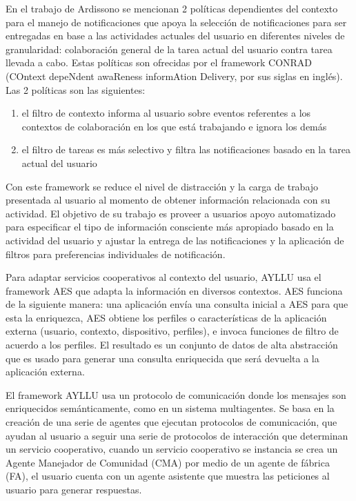 En el trabajo de Ardissono \cite{ardissono2012context} se mencionan 2 pol\'iticas dependientes del contexto para el manejo de notificaciones que apoya la selecci\'on de notificaciones para ser entregadas en base a las actividades actuales del usuario en diferentes niveles de granularidad: colaboraci\'on general de la tarea actual del usuario contra tarea llevada a cabo. Estas pol\'iticas son ofrecidas por el framework CONRAD (COntext depeNdent awaReness informAtion Delivery, por sus siglas en ingl\'es). Las 2 pol\'iticas son las siguientes:

\begin{enumerate}
\item el filtro de contexto informa al usuario sobre eventos referentes a los contextos de colaboraci\'on en los que est\'a trabajando e ignora los dem\'as
\item el filtro de tareas es m\'as selectivo y filtra las notificaciones basado en la tarea actual del usuario
\end{enumerate}

Con este framework se reduce el nivel de distracci\'on y la carga de trabajo presentada al usuario al momento de obtener informaci\'on relacionada con su actividad.
El objetivo de su trabajo es proveer a usuarios apoyo automatizado para especificar el tipo de informaci\'on consciente m\'as apropiado basado en la actividad del usuario y ajustar la entrega de las notificaciones y la aplicaci\'on de filtros para preferencias individuales de notificaci\'on.

Para adaptar servicios cooperativos al contexto del usuario, AYLLU \cite{arias2012platform} usa el framework AES que adapta la informaci\'on en diversos contextos. AES funciona de la siguiente manera: una aplicaci\'on env\'ia una consulta inicial a AES para que esta la enriquezca, AES obtiene los perfiles o caracter\'isticas de la aplicaci\'on externa (usuario, contexto, dispositivo, perfiles), e invoca funciones de filtro de acuerdo a los perfiles. El resultado es un conjunto de datos de alta abstracci\'on que es usado para generar una consulta enriquecida que ser\'a devuelta a la aplicaci\'on externa.

El framework AYLLU \cite{arias2012platform} usa un protocolo de comunicaci\'on donde los mensajes son enriquecidos sem\'anticamente, como en un sistema multiagentes. Se basa en la creaci\'on de una serie de agentes que ejecutan protocolos de  comunicaci\'on, que ayudan al usuario a seguir una serie de protocolos de interacci\'on que determinan un servicio cooperativo, cuando un servicio cooperativo se instancia se crea un Agente Manejador de Comunidad (CMA) por medio de un agente de f\'abrica (FA), el usuario cuenta con un agente asistente que muestra las peticiones al usuario para generar respuestas.

